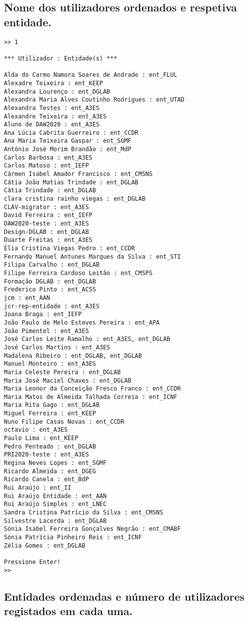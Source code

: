 \documentclass[11pt,a4paper]{report}%
\begin{document}
\subsection{Nome dos utilizadores ordenados e respetiva entidade.}

\begin{verbatim}
>> 1

*** Utilizador : Entidade(s) ***

Alda do Carmo Namora Soares de Andrade : ent_FLUL
Alexadre Teixeira : ent_KEEP
Alexandra Lourenço : ent_DGLAB
Alexandra Maria Alves Coutinho Rodrigues : ent_UTAD
Alexandra Testes : ent_A3ES
Alexandre Teixeira : ent_A3ES
Aluno de DAW2020 : ent_A3ES
Ana Lúcia Cabrita Guerreiro : ent_CCDR
Ana Maria Teixeira Gaspar : ent_SGMF
António José Morim Brandão : ent_MdP
Carlos Barbosa : ent_A3ES
Carlos Matoso : ent_IEFP
Cármen Isabel Amador Francisco : ent_CMSNS
Cátia João Matias Trindade : ent_DGLAB
Cátia Trindade : ent_DGLAB
clara cristina rainho viegas : ent_DGLAB
CLAV-migrator : ent_A3ES
David Ferreira : ent_IEFP
DAW2020-teste : ent_A3ES
Design-DGLAB : ent_DGLAB
Duarte Freitas : ent_A3ES
Élia Cristina Viegas Pedro : ent_CCDR
Fernando Manuel Antunes Marques da Silva : ent_STI
Filipa Carvalho : ent_DGLAB
Filipe Ferreira Cardoso Leitão : ent_CMSPS
Formação DGLAB : ent_DGLAB
Frederico Pinto : ent_ACSS
jcm : ent_AAN
jcr-rep-entidade : ent_A3ES
Joana Braga : ent_IEFP
João Paulo de Melo Esteves Pereira : ent_APA
João Pimentel : ent_A3ES
José Carlos Leite Ramalho : ent_A3ES, ent_DGLAB
José Carlos Martins : ent_A3ES
Madalena Ribeiro : ent_DGLAB, ent_DGLAB
Manuel Monteiro : ent_A3ES
Maria Celeste Pereira : ent_DGLAB
Maria José Maciel Chaves : ent_DGLAB
Maria Leonor da Conceição Fresco Franco : ent_CCDR
Maria Matos de Almeida Talhada Correia : ent_ICNF
Maria Rita Gago : ent_DGLAB
Miguel Ferreira : ent_KEEP
Nuno Filipe Casas Novas : ent_CCDR
octavio : ent_A3ES
Paulo Lima : ent_KEEP
Pedro Penteado : ent_DGLAB
PRI2020-teste : ent_A3ES
Regina Neves Lopes : ent_SGMF
Ricardo Almeida : ent_DGEG
Ricardo Canela : ent_BdP
Rui Araújo : ent_II
Rui Araújo Entidade : ent_AAN
Rui Araújo Simples : ent_LNEC
Sandra Cristina Patrício da Silva : ent_CMSNS
Silvestre Lacerda : ent_DGLAB
Sónia Isabel Ferreira Gonçalves Negrão : ent_CMABF
Sónia Patrícia Pinheiro Reis : ent_ICNF
Zélia Gomes : ent_DGLAB

Pressione Enter!
>> 
\end{verbatim}


\subsection{Entidades ordenadas e número de utilizadores registados em cada uma.}
\end{document}
